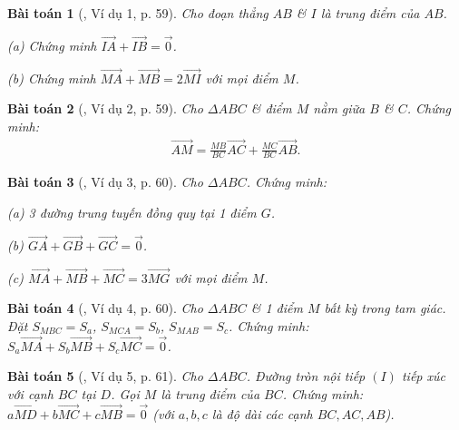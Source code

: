 \documentclass{article}
\numberwithin{equation}{section}
\newtheorem{baitoan}{Bài toán}[section]
\begin{document}
\begin{baitoan}[\cite{Hai_Hung_Thu_Tung2022_tap_1}, Ví dụ 1, p. 59]
	Cho đoạn thẳng $AB$ \& $I$ là trung điểm của $AB$.
	\begin{enumerate*}
		\item[(a)] Chứng minh $\overrightarrow{IA} + \overrightarrow{IB} = \vec{0}$.
		\item[(b)] Chứng minh $\overrightarrow{MA} + \overrightarrow{MB} = 2\overrightarrow{MI}$ với mọi điểm $M$.
	\end{enumerate*}
\end{baitoan}

\begin{baitoan}[\cite{Hai_Hung_Thu_Tung2022_tap_1}, Ví dụ 2, p. 59]
	Cho $\Delta ABC$ \& điểm $M$ nằm giữa $B$ \& $C$. Chứng minh:
	\begin{align*}
		\overrightarrow{AM} = \frac{MB}{BC}\overrightarrow{AC} + \frac{MC}{BC}\overrightarrow{AB}.
	\end{align*}
\end{baitoan}

\begin{baitoan}[\cite{Hai_Hung_Thu_Tung2022_tap_1}, Ví dụ 3, p. 60]
	Cho $\Delta ABC$. Chứng minh:
	\begin{enumerate*}
		\item[(a)] 3 đường trung tuyến đồng quy tại 1 điểm $G$.
		\item[(b)] $\overrightarrow{GA} + \overrightarrow{GB} + \overrightarrow{GC} = \vec{0}$.
		\item[(c)] $\overrightarrow{MA} + \overrightarrow{MB} + \overrightarrow{MC} = 3\overrightarrow{MG}$ với mọi điểm $M$.
	\end{enumerate*}
\end{baitoan}

\begin{baitoan}[\cite{Hai_Hung_Thu_Tung2022_tap_1}, Ví dụ 4, p. 60]
	Cho $\Delta ABC$ \& 1 điểm $M$ bất kỳ trong tam giác. Đặt $S_{MBC} = S_a$, $S_{MCA} = S_b$, $S_{MAB} = S_c$. Chứng minh: $S_a\overrightarrow{MA} + S_b\overrightarrow{MB} + S_c\overrightarrow{MC} = \vec{0}$.
\end{baitoan}

\begin{baitoan}[\cite{Hai_Hung_Thu_Tung2022_tap_1}, Ví dụ 5, p. 61]
	Cho $\Delta ABC$. Đường tròn nội tiếp $(I)$ tiếp xúc với cạnh $BC$ tại $D$. Gọi $M$ là trung điểm của $BC$. Chứng minh: $a\overrightarrow{MD} + b\overrightarrow{MC} + c\overrightarrow{MB} = \vec{0}$ (với $a,b,c$ là độ dài các cạnh $BC,AC,AB$).
\end{baitoan}
\end{document}
